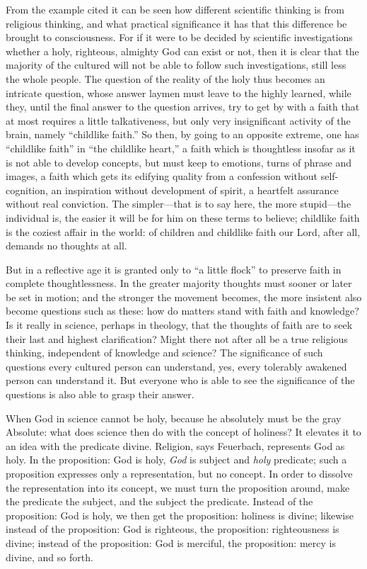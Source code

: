 \documentclass[12pt]{book}
\newcommand{\opage}[1]{\marginnote{\footnotesize\textit{[#1]}}}
\begin{document}
From the example cited it can be seen how different scientific thinking
is from religious thinking, and what practical significance it has that
this difference be brought to consciousness. For if it were to be
decided by scientific investigations whether a holy, righteous, almighty
God can exist or not, then it is clear that the majority of the cultured
will not be able to follow such investigations, still less the whole
people. The question of the reality of the holy thus becomes an
intricate question, whose answer laymen must leave to the highly
learned, while they, until the final answer to the question arrives, try
to get by with a faith that at most requires a little talkativeness, but
only very insignificant activity of the brain, namely ``childlike
faith.'' So then, by going to an opposite extreme, one has ``childlike
faith'' in ``the childlike heart,'' a faith which is thoughtless insofar
as it is not able to develop concepts, but must keep to emotions, turns
of phrase and images, a faith which gets its edifying quality from a
confession without self-cognition, an inspiration without development of
spirit, a heartfelt assurance without real conviction. The simpler---that
is to say here, the more stupid---the individual is, the easier it will
be for him on these terms to believe; childlike faith is the coziest
affair in the world: of children and childlike faith our Lord, after
all, demands no thoughts at all.

But in a reflective age it is granted only to ``a little flock'' to
preserve faith in complete thoughtlessness. In the greater majority
thoughts must sooner or later be set in motion; and the stronger the
movement becomes, the more insistent also become questions such as
these: how do matters stand with faith and knowledge?
\opage{112}\setcounter{footnote}{0}%
Is it really in science, perhaps in theology, that the thoughts of
faith are to seek their last and highest clarification? Might there not
after all be a true religious thinking, independent of knowledge and
science? The significance of such questions every cultured person can
understand, yes, every tolerably awakened person can understand it. But
everyone who is able to see the significance of the questions is also
able to grasp their answer.

When God in science cannot be holy, because he absolutely must be the
gray Absolute: what does science then do with the concept of holiness?
It elevates it to an idea with the predicate divine. Religion, says
Feuerbach, represents God as holy. In the proposition: God is holy,
\textit{God} is subject and \textit{holy} predicate; such a proposition
expresses only a representation, but no concept. In order to dissolve
the representation into its concept, we must turn the proposition
around, make the predicate the subject, and the subject the predicate.
Instead of the proposition: God is holy, we then get the proposition:
holiness is divine; likewise instead of the proposition: God is
righteous, the proposition: righteousness is divine; instead of the
proposition: God is merciful, the proposition: mercy is divine, and so
forth.
\end{document}
